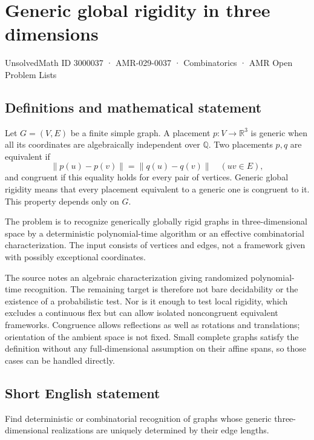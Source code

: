 \documentclass[11pt,a4paper]{article}
\begin{document}
\section*{Generic global rigidity in three dimensions}\label{3000037}
{\small UnsolvedMath ID 3000037 · AMR-029-0037 · Combinatorics · AMR Open Problem Lists}
\subsection{Definitions and mathematical statement}
Let $G=(V,E)$ be a finite simple graph. A placement $p:V\to\mathbb R^3$
is generic when all its coordinates are algebraically independent
over $\mathbb Q$. Two placements $p,q$ are equivalent if
\[
                       \|p(u)-p(v)\|=\|q(u)-q(v)\|
                                           \quad(uv\in E),
\]
and congruent if this equality holds for every pair of vertices.
Generic global rigidity means that every placement equivalent to a
generic one is congruent to it. This property depends only on $G$.

The problem is to recognize generically globally rigid graphs in
three-dimensional space by a deterministic polynomial-time algorithm
or an effective combinatorial characterization. The input consists of
vertices and edges, not a framework given with possibly exceptional
coordinates.

The source notes an algebraic characterization giving randomized
polynomial-time recognition. The remaining target is therefore not
bare decidability or the existence of a probabilistic test. Nor is it
enough to test local rigidity, which excludes a continuous flex but can
allow isolated noncongruent equivalent frameworks. Congruence allows
reflections as well as rotations and translations; orientation of the
ambient space is not fixed. Small complete graphs satisfy the definition
without any full-dimensional assumption on their affine spans, so
those cases can be handled directly.
\subsection{Short English statement}
Find deterministic or combinatorial recognition of graphs whose
generic three-dimensional realizations are uniquely determined by their edge lengths.
\end{document}
